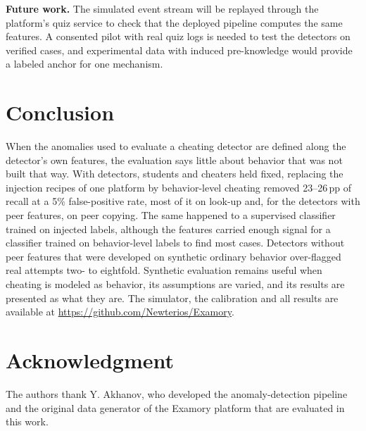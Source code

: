 \documentclass[conference,a4paper]{IEEEtran}
\newcommand{\pp}{\,pp}
\begin{document}
\textbf{Future work.} The simulated event stream will be replayed through the platform's quiz service to check that the deployed pipeline computes the same features. A consented pilot with real quiz logs is needed to test the detectors on verified cases, and experimental data with induced pre-knowledge \cite{toton2019preknowledge} would provide a labeled anchor for one mechanism.

\section{Conclusion}
When the anomalies used to evaluate a cheating detector are defined along the detector's own features, the evaluation says little about behavior that was not built that way. With detectors, students and cheaters held fixed, replacing the injection recipes of one platform by behavior-level cheating removed 23--26\pp{} of recall at a 5\% false-positive rate, most of it on look-up and, for the detectors with peer features, on peer copying. The same happened to a supervised classifier trained on injected labels, although the features carried enough signal for a classifier trained on behavior-level labels to find most cases. Detectors without peer features that were developed on synthetic ordinary behavior over-flagged real attempts two- to eightfold. Synthetic evaluation remains useful when cheating is modeled as behavior, its assumptions are varied, and its results are presented as what they are. The simulator, the calibration and all results are available at \url{https://github.com/Newterios/Examory}.

\section*{Acknowledgment}
The authors thank Y. Akhanov, who developed the anomaly-detection pipeline and the original data generator of the Examory platform that are evaluated in this work.




\end{document}
